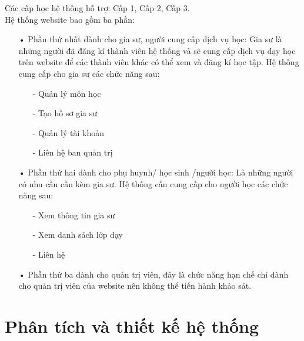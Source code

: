 \documentclass[12pt,a4paper]{report}
\begin{document}
Các cấp học hệ thống hỗ trợ: Cấp 1, Cấp 2, Cấp 3.\\

Hệ thống website bao gồm ba phần:
\begin{itemize}
\item[•]Phần thứ nhất dành cho gia sư, người cung cấp dịch vụ học: Gia sư là những người đã đăng kí thành viên hệ thống và sẽ cung cấp dịch vụ dạy học trên website để các thành viên khác có thể xem và đăng kí học tập. Hệ thống cung cấp cho gia sư các
chức năng sau:
\begin{itemize}
\item[-]Quản lý môn học
\item[-]Tạo hồ sơ gia sư
\item[-]Quản lý tài khoản
\item[-]Liên hệ ban quản trị
\end{itemize}
\item[•]Phần thứ hai dành cho phụ huynh/ học sinh /người học: Là những người có nhu cầu cần kèm gia sư. Hệ thống cần cung cấp cho người học các chức năng sau:
\begin{itemize}
\item[-]Xem thông tin gia sư
\item[-]Xem danh sách lớp dạy
\item[-]Liên hệ
\end{itemize}
\item[•]Phần thứ ba dành cho quản trị viên, đây là chức năng hạn chế chỉ dành cho quản trị viên của website nên không thể tiến hành khảo sát.
\end{itemize}
\section{Phân tích và thiết kế hệ thống}
\end{document}
